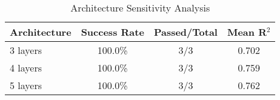 
\begin{table}[htbp]
\centering
\caption{Architecture Sensitivity Analysis}
\label{tab:exp3_architecture}
\begin{tabular}{lccc}
\hline
\textbf{Architecture} & \textbf{Success Rate} & \textbf{Passed/Total} & \textbf{Mean R$^2$} \\
\hline
3 layers & 100.0\% & 3/3 & 0.702 \\
4 layers & 100.0\% & 3/3 & 0.759 \\
5 layers & 100.0\% & 3/3 & 0.762 \\
\hline
\end{tabular}
\end{table}
